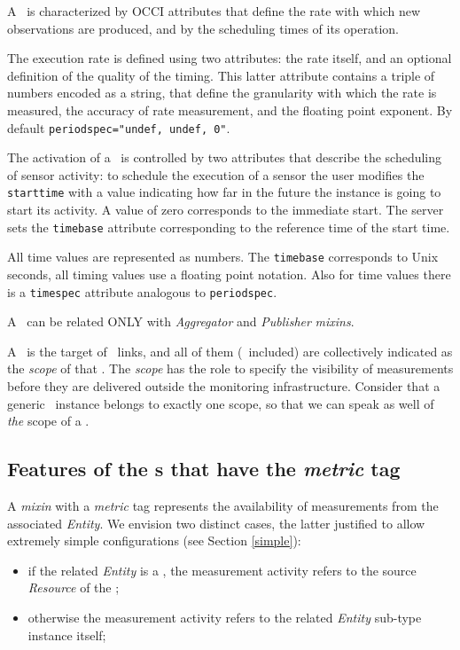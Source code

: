 \documentclass[10pt]{article}  %
\begin{document}
A \sens\ is characterized by OCCI attributes that define the rate with which new observations are produced, and by the scheduling times of its operation.

The execution rate is defined using two attributes: the rate itself, and an optional definition of the quality of the timing. This latter attribute contains a triple of numbers encoded as a string, that define the granularity with which the rate is measured, the accuracy of rate measurement, and the floating point exponent. By default \verb|periodspec="undef, undef, 0"|.

The activation of a \sens\ is controlled by two attributes that describe the scheduling of sensor activity: to schedule the execution of a sensor the user modifies the {\tt starttime} with a value indicating how far in the future the instance is going to start its activity. A value of zero corresponds to the immediate start. The server sets the {\tt timebase} attribute corresponding to the reference time of the start time.

All time values are represented as numbers. The {\tt timebase} corresponds to Unix seconds, all timing values use a floating point notation. Also for time values there is a {\tt timespec} attribute analogous to {\tt periodspec}.

A \sens\ can be related ONLY with {\em Aggregator} and {\em Publisher} {\em mixins}.

A \sens\ is the target of \coll\ links, and all of them (\sens\ included) are collectively indicated as the {\em scope} of that \sens . The {\em scope} has the role to specify the visibility of measurements before they are delivered outside the monitoring infrastructure. Consider that a generic \coll\ instance belongs to exactly one scope, so that we can speak as well of {\em the} scope of a \coll .
 


\subsection{Features of the \mi s that have the {\em metric} tag \label{sec:Tool}}

A {\em mixin} with a {\em metric} tag represents the availability of measurements from the associated {\em Entity}. We envision two distinct cases, the latter justified to allow extremely simple configurations (see Section \ref{simple}):
\begin{itemize}
\item if the related {\em Entity} is a \coll, the measurement activity refers to the source {\em Resource} of the \coll;
\item otherwise the measurement activity refers to the related {\em Entity} sub-type instance itself;
\end{itemize} 
\end{document}
